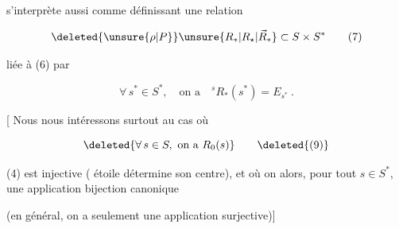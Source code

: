 s'interprète aussi comme définissant une relation

\[
 \deleted{\unsure{\rho|P}}\unsure{R_*|R_{\star}|\vec{R}_*}\subset S\times S^* \tag*{(7)}
\]

liée à (6) par

\[
 \forall\,s^*\in S^*,\quad\text{on a}\quad{}^sR_*(s^*)=E_{s^*}\ . \tag*{(8)}
\]

[ Nous nous intéressons surtout au cas où

\[
 \deleted{\forall\,s\in S,\ \text{on a }R_0(s)} \tag*{\deleted{(9)}}
\]

(4) est injective ( étoile détermine son centre),
et où on  alors, pour tout $s\in S^*$, une
application bijection canonique


(en général, on a seulement une application surjective)]

